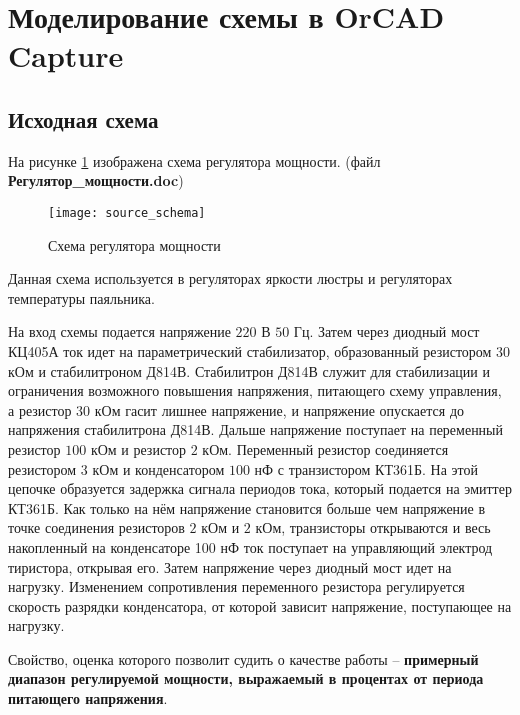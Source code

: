 





\newpage

\section{Моделирование схемы в OrCAD Capture}

\subsection{Исходная схема}

На рисунке \ref{pic:scheme} изображена схема регулятора мощности. (файл \textbf{Регулятор\_мощности.doc})

\begin{figure}[H]
\begin{center}
	\texttt{[image: source\_schema]}
	\caption{Схема регулятора мощности}
	\label{pic:scheme}
\end{center}
\end{figure}

Данная схема используется в регуляторах яркости люстры и регуляторах температуры паяльника.

На вход схемы подается напряжение $220$ В $50$ Гц. Затем через диодный мост КЦ405А ток идет на параметрический стабилизатор, образованный резистором $30$ кОм и стабилитроном Д814В. Стабилитрон Д814В служит для стабилизации и ограничения возможного повышения напряжения, питающего схему управления, а резистор $30$ кОм гасит лишнее напряжение, и напряжение опускается до напряжения стабилитрона Д814В. Дальше напряжение поступает на переменный резистор $100$ кОм и резистор $2$ кОм. Переменный резистор соединяется резистором $3$ кОм и конденсатором $100$ нФ с транзистором КТ361Б. На этой цепочке образуется задержка сигнала периодов тока, который подается на эмиттер КТ361Б. Как только на нём напряжение становится больше чем напряжение в точке соединения резисторов $2$ кОм и $2$ кОм, транзисторы открываются и весь накопленный на конденсаторе 100 нФ ток поступает на управляющий электрод тиристора, открывая его. Затем напряжение через диодный мост идет на нагрузку. Изменением сопротивления переменного резистора регулируется скорость разрядки конденсатора, от которой зависит напряжение, поступающее на нагрузку.

Свойство, оценка которого позволит судить о качестве работы -- \textbf{примерный диапазон регулируемой мощности, выражаемый в процентах от периода питающего напряжения}.

